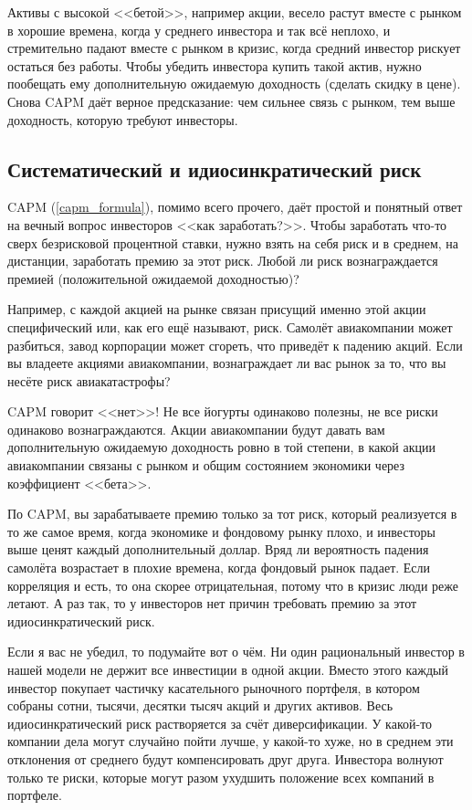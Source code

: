 Активы с высокой <<бетой>>, например акции, весело растут вместе с рынком в хорошие времена, когда у среднего инвестора и так всё неплохо, и стремительно падают вместе с рынком в кризис, когда средний инвестор рискует остаться без работы. Чтобы убедить инвестора купить такой актив, нужно пообещать ему дополнительную ожидаемую доходность (сделать скидку в цене). Снова CAPM даёт верное предсказание: чем сильнее связь с рынком, тем выше доходность, которую требуют инвесторы.

\subsection{Систематический и идиосинкратический риск}

CAPM (\ref{capm_formula}), помимо всего прочего, даёт простой и понятный ответ на вечный вопрос инвесторов <<как заработать?>>. Чтобы заработать что-то сверх безрисковой процентной ставки, нужно взять на себя риск и в среднем, на дистанции, заработать премию за этот риск. Любой ли риск вознаграждается премией (положительной ожидаемой доходностью)?

Например, с каждой акцией на рынке связан присущий именно этой акции специфический или, как его ещё называют,  риск. Самолёт авиакомпании может разбиться, завод корпорации может сгореть, что приведёт к падению акций. Если вы владеете акциями авиакомпании, вознаграждает ли вас рынок за то, что вы несёте риск авиакатастрофы?

CAPM говорит <<нет>>! Не все йогурты одинаково полезны, не все риски одинаково вознаграждаются. Акции авиакомпании будут давать вам дополнительную ожидаемую доходность ровно в той степени, в какой акции авиакомпании связаны с рынком и общим состоянием экономики через коэффициент <<бета>>.

По CAPM, вы зарабатываете премию только за тот риск, который реализуется в то же самое время, когда экономике и фондовому рынку плохо, и инвесторы выше ценят каждый дополнительный доллар. Вряд ли вероятность падения самолёта возрастает в плохие времена, когда фондовый рынок падает. Если корреляция и есть, то она скорее отрицательная, потому что в кризис люди реже летают. А раз так, то у инвесторов нет причин требовать премию за этот идиосинкратический риск. 

Если я вас не убедил, то подумайте вот о чём. Ни один рациональный инвестор в нашей модели не держит все инвестиции в одной акции. Вместо этого каждый инвестор покупает частичку касательного рыночного портфеля, в котором собраны сотни, тысячи, десятки тысяч акций и других активов. Весь идиосинкратический риск растворяется за счёт диверсификации. У какой-то компании дела могут случайно пойти лучше, у какой-то хуже, но в среднем эти отклонения от среднего будут компенсировать друг друга. Инвестора волнуют только те риски, которые могут разом ухудшить положение всех компаний в портфеле.

